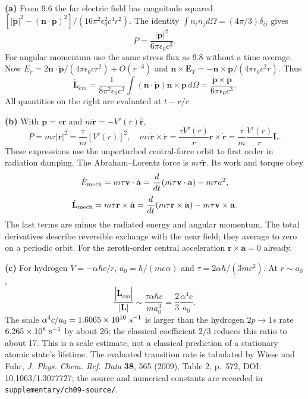 \textbf{(a)} From 9.6 the far electric field has magnitude squared
$[|\ddot{\mathbf p}|^2-(\mathbf n\cdot\ddot{\mathbf p})^2]/
(16\pi^2\epsilon_0^2c^4r^2)$. The identity
$\int n_in_jd\Omega=(4\pi/3)\delta_{ij}$ gives
\[
\boxed{P=\frac{|\ddot{\mathbf p}|^2}{6\pi\epsilon_0c^3}.}
\]
For angular momentum use the same stress flux as 9.8 without a time
average. Now $E_r=2\mathbf n\cdot\dot{\mathbf p}/
(4\pi\epsilon_0cr^2)+O(r^{-3})$ and
$\mathbf n\times\mathbf E_T=-\mathbf n\times\ddot{\mathbf p}/
(4\pi\epsilon_0c^2r)$. Thus
\[
\dot{\mathbf L}_{em}=\frac{1}{8\pi^2\epsilon_0c^3}
\int(\mathbf n\cdot\dot{\mathbf p})\mathbf n\times\ddot{\mathbf p}
\,d\Omega
=\boxed{\frac{\dot{\mathbf p}\times\ddot{\mathbf p}}
{6\pi\epsilon_0c^3}}.
\]
All quantities on the right are evaluated at $t-r/c$.

\textbf{(b)} With $\mathbf p=e\mathbf r$ and
$m\ddot{\mathbf r}=-V'(r)\hat{\mathbf r}$,
\[
P=m\tau|\ddot{\mathbf r}|^2=\frac\tau m[V'(r)]^2,
\quad
m\tau\dot{\mathbf r}\times\ddot{\mathbf r}
=\frac{\tau V'(r)}r\mathbf r\times\dot{\mathbf r}
=\frac\tau m\frac{V'(r)}r\mathbf L.
\]
These expressions use the unperturbed central-force orbit to first order
in radiation damping. The Abraham--Lorentz force is
$m\tau\dddot{\mathbf r}$. Its work and torque obey
\[
\dot E_{\rm mech}=m\tau\mathbf v\cdot\dot{\mathbf a}
=\frac d{dt}(m\tau\mathbf v\cdot\mathbf a)-m\tau a^2,
\]
\[
\dot{\mathbf L}_{\rm mech}=m\tau\mathbf r\times\dot{\mathbf a}
=\frac d{dt}(m\tau\mathbf r\times\mathbf a)
-m\tau\mathbf v\times\mathbf a.
\]
The last terms are minus the radiated energy and angular momentum.
The total derivatives describe reversible exchange with the near field;
they average to zero on a periodic orbit. For the zeroth-order central
acceleration $\mathbf r\times\mathbf a=0$ already.

\textbf{(c)} For hydrogen $V=-\alpha\hbar c/r$,
$a_0=\hbar/(mc\alpha)$ and $\tau=2\alpha\hbar/(3mc^2)$.
At $r\sim a_0$,
\[
\frac{|\dot{\mathbf L}_{em}|}{|\mathbf L|}
\sim\frac{\tau\alpha\hbar c}{ma_0^3}
=\boxed{\frac23\frac{\alpha^4c}{a_0}}.
\]
The scale $\alpha^4c/a_0=1.6065\times10^{10}\ {\rm s}^{-1}$ is
larger than the hydrogen $2p\to1s$ rate $6.265\times10^8\ {\rm s}^{-1}$
by about 26; the classical coefficient $2/3$ reduces this ratio to about
17. This is a scale estimate, not a classical prediction of a stationary
atomic state's lifetime. The evaluated transition rate is tabulated by
Wiese and Fuhr, \emph{J. Phys. Chem. Ref. Data} \textbf{38}, 565 (2009),
Table 2, p.~572, DOI: 10.1063/1.3077727; the source and numerical constants
are recorded in \texttt{supplementary/ch09-source/}.

